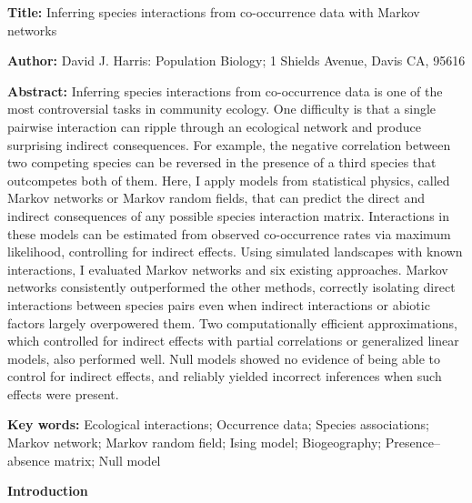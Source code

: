 \documentclass[12pt,]{article}
\date{}
\begin{document}
\begin{spacing}{1.9}
\begin{flushleft}
\renewcommand{\headrulewidth}{0pt}

\setlength{\parskip}{1pt}

\textbf{Title:} Inferring species interactions from co-occurrence data
with Markov networks

\textbf{Author:} David J. Harris: Population Biology; 1 Shields Avenue,
Davis CA, 95616

\textbf{Abstract:} Inferring species interactions from co-occurrence
data is one of the most controversial tasks in community ecology. One
difficulty is that a single pairwise interaction can ripple through an
ecological network and produce surprising indirect consequences. For
example, the negative correlation between two competing species can be
reversed in the presence of a third species that outcompetes both of
them. Here, I apply models from statistical physics, called Markov
networks or Markov random fields, that can predict the direct and
indirect consequences of any possible species interaction matrix.
Interactions in these models can be estimated from observed
co-occurrence rates via maximum likelihood, controlling for indirect
effects. Using simulated landscapes with known interactions, I evaluated
Markov networks and six existing approaches. Markov networks
consistently outperformed the other methods, correctly isolating direct
interactions between species pairs even when indirect interactions or
abiotic factors largely overpowered them. Two computationally efficient
approximations, which controlled for indirect effects with partial
correlations or generalized linear models, also performed well. Null
models showed no evidence of being able to control for indirect effects,
and reliably yielded incorrect inferences when such effects were
present.

\textbf{Key words:} Ecological interactions; Occurrence data; Species
associations; Markov network; Markov random field; Ising model;
Biogeography; Presence--absence matrix; Null model

\noindent\textbf{Introduction}

\setlength{\parindent}{2em}


\end{flushleft}
\end{spacing}
\end{document}
